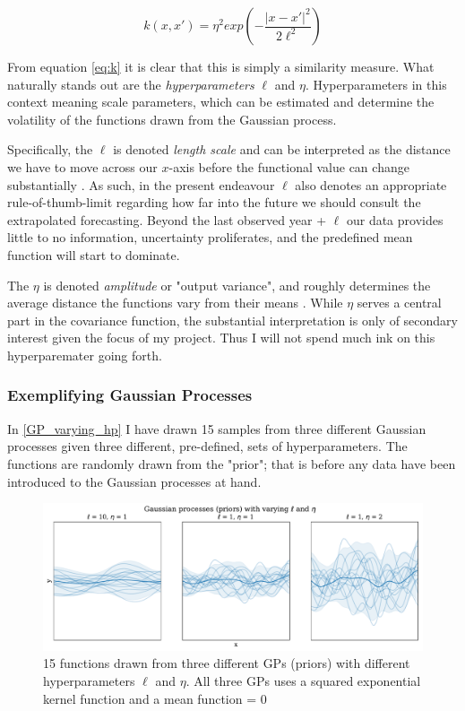 \documentclass[a4paper]{article}
\begin{document}
\[
k(x,x') = \eta^2 exp\left(-\frac{|x-x'|^2}{2\ell^2}\right) \tag{7} \label{eq:k}
\]

From equation \ref{eq:k} it is clear that this is simply a similarity measure. What naturally stands out are the \emph{hyperparameters} $\ell$ and $\eta$. Hyperparameters in this context meaning scale parameters, which can be estimated and determine the volatility of the functions drawn from the Gaussian process.\par

Specifically, the $\ell$ is denoted \emph{length scale} \cite[501-502]{Gelman_2013} and can be interpreted as the distance we have to move across our $x$-axis before the functional value can change substantially \citep[14-15]{williams2006gaussian}. As such, in the present endeavour $\ell$ also denotes an appropriate rule-of-thumb-limit regarding how far into the future we should consult the extrapolated forecasting. Beyond the last observed year + $\ell$ our data provides little to no information, uncertainty proliferates, and the predefined mean function will start to dominate.\par

The $\eta$ is denoted \emph{amplitude} or "output variance", and roughly determines the average distance the functions vary from their means \cite[502]{Gelman_2013}. While $\eta$ serves a central part in the covariance function, the substantial interpretation is only of secondary interest given the focus of my project. Thus I will not spend much ink on this hyperparemater going forth.\par

\subsubsection{Exemplifying Gaussian Processes}

In \autoref{GP_varying_hp} I have drawn 15 samples from three different Gaussian processes given three different, pre-defined, sets of hyperparameters. The functions are randomly drawn from the "prior"; that is before any data have been introduced to the Gaussian processes at hand.\par

\begin{figure}[!htb]
	\centering
	\includegraphics[scale=0.47]{GP_varying_hp.pdf}
    \caption{\footnotesize{15 functions drawn from three different GPs (priors) with different hyperparameters $\ell$ and $\eta$. All three GPs uses a squared exponential kernel function and a mean function = 0}}\label{GP_varying_hp}
\end{figure}
\end{document}
